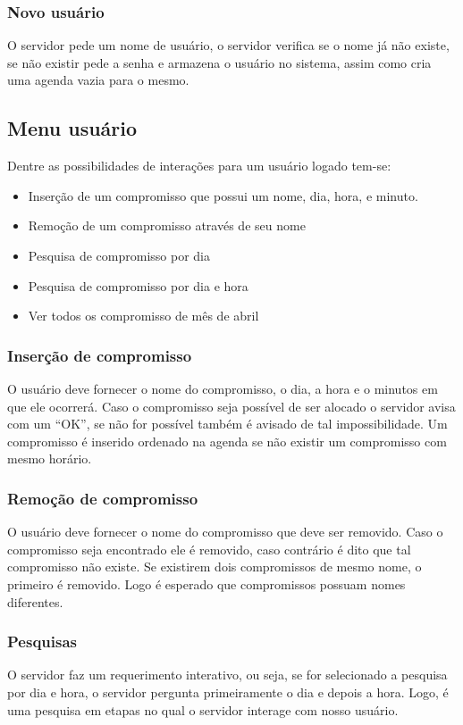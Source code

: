 \documentclass[10pt,a4paper]{article}
\begin{document}
\subsubsection{Novo usuário}
O servidor pede um nome de usuário, o servidor verifica se o nome já
não existe, se não existir pede a senha e armazena o usuário no
sistema, assim como cria uma agenda vazia para o mesmo.

\subsection{Menu usuário}
Dentre as possibilidades de interações para um usuário logado tem-se:

\begin{itemize}
\item Inserção de um compromisso que possui um nome, dia, hora, e minuto. 
\item Remoção de um compromisso através de seu nome
\item Pesquisa de compromisso por dia
\item Pesquisa de compromisso por dia e hora
\item Ver todos os compromisso de mês de abril
\end{itemize}

\subsubsection{Inserção de compromisso}
O usuário deve fornecer o nome do compromisso, o dia, a hora e o
minutos em que ele ocorrerá.
Caso o compromisso seja possível de ser alocado o servidor avisa com
um ``OK'', se não for possível também é avisado de tal impossibilidade.
Um compromisso é inserido ordenado na agenda se não existir um
compromisso com mesmo horário.

\subsubsection{Remoção de compromisso}
O usuário deve fornecer o nome do compromisso que deve ser removido.
Caso o compromisso seja encontrado ele é removido, caso contrário é
dito que tal compromisso não existe.
Se existirem dois compromissos de mesmo nome, o primeiro é removido.
Logo é esperado que compromissos possuam nomes diferentes.


\subsubsection{Pesquisas}
O servidor faz um requerimento interativo, ou seja, se for selecionado
a pesquisa por dia e hora, o servidor pergunta primeiramente o dia e
depois a hora. Logo, é uma pesquisa em etapas no qual o servidor
interage com nosso usuário.
\end{document}
